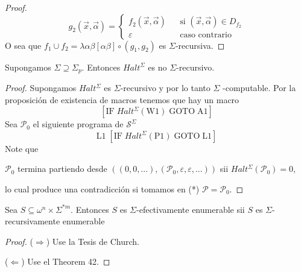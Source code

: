 \begin{lemma}
\begin{proof}
    \[
      \displaystyle
        g_{2}(\vec{x},\vec{\alpha})=\left\{
          \begin{array}{lll}
            f_{2}(\vec{x},\vec{\alpha}) & & \text{si }(\vec{x},\vec{\alpha})\in D_{f_{2}} \\
            \varepsilon & & \text{caso contrario}
          \end{array} \right.
    \]
    O sea que $f_{1}\cup f_{2}=\lambda \alpha \beta \left[ \alpha \beta \right] \circ (g_{1},g_{2})$ es
    $\Sigma $-recursiva.
  \end{proof}
  \end{lemma}

  \begin{lemma}
    Supongamos $\Sigma \supseteq \Sigma _{p}$. Entonces $ Halt^{\Sigma }$ es no $\Sigma $-recursivo.
  \begin{proof}
    Supongamos $Halt^{\Sigma }$ es $\Sigma $-recursivo y por lo tanto $\Sigma $ -computable.
    Por la proposición de existencia de macros tenemos que hay un macro
    \[
      \displaystyle \left[ \mathrm{IF}\;Halt^{\Sigma }(\mathrm{W}1)\;\mathrm{GOTO}\;\mathrm{A}1 \right]
    \]
    Sea $\mathcal{P}_{0}$ el siguiente programa de $\mathcal{S}^{\Sigma }$
    \[
      \displaystyle \mathrm{L}1\;\left[ \mathrm{IF}\;Halt^{\Sigma }(\mathrm{P}1)\;\mathrm{GOTO}\; \mathrm{L}1\right]
    \]
    Note que

    $\mathcal{P}_{0}$ termina partiendo desde $\left( (0,0,...),( \mathcal{P}_{0},\varepsilon ,\varepsilon ,...)
    \right) $ sii $Halt^{\Sigma }( \mathcal{P}_{0})=0$,

    \noindent lo cual produce una contradicción si tomamos en (*) $\mathcal{P}= \mathcal{P}_{0}$.
  \end{proof}
  \end{lemma}


  \begin{theorem} %
    Sea $S\subseteq \omega ^{n}\times \Sigma ^{\ast m}$. Entonces $S$ es $\Sigma $-efectivamente enumerable
    sii $S$ es $\Sigma $-recursivamente enumerable
  \begin{proof}
    ($\Rightarrow $) Use la Tesis de Church.

    ($\Leftarrow $) Use el Theorem 42.
  \end{proof}
  \end{theorem}

